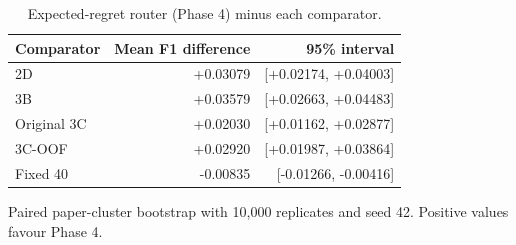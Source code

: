 \begin{table}[htbp]
\centering\small
\caption{Expected-regret router (Phase 4) minus each comparator.}
\label{tab:pairedregret}
\begin{tabular}{@{}lrr@{}}
\toprule
Comparator & Mean F1 difference & 95\% interval\\
\midrule
2D & +0.03079 & [+0.02174, +0.04003]\\
3B & +0.03579 & [+0.02663, +0.04483]\\
Original 3C & +0.02030 & [+0.01162, +0.02877]\\
3C-OOF & +0.02920 & [+0.01987, +0.03864]\\
Fixed 40 & -0.00835 & [-0.01266, -0.00416]\\
\bottomrule
\end{tabular}
\par\smallskip\begin{minipage}{\textwidth}\footnotesize Paired paper-cluster bootstrap with 10,000 replicates and seed 42. Positive values favour Phase 4.\end{minipage}
\end{table}
